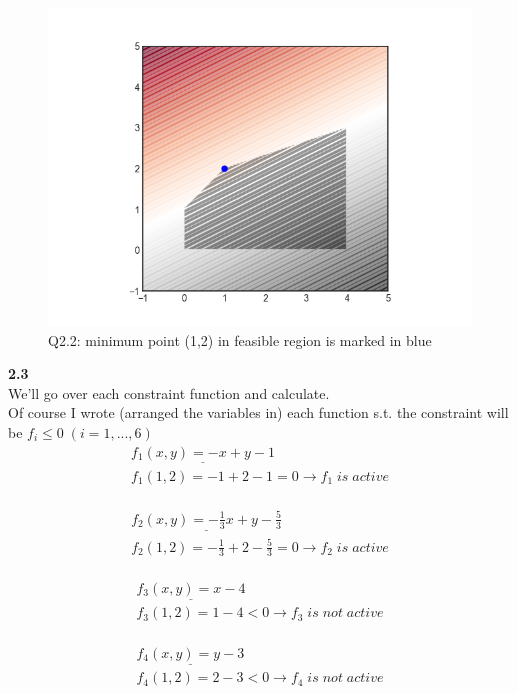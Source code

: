 \documentclass[fleqn]{article}
\begin{document}
\begin{figure}[h!]
\includegraphics[width=0.8\linewidth]{q2_2.PNG}
\caption{Q2.2: minimum point (1,2) in feasible region is marked in blue}
\end{figure}

\textbf{2.3} \\
We'll go over each constraint function and calculate.\\
Of course I wrote (arranged the variables in) each function s.t. the constraint will be $f_i \leq 0 \; (i=1,...,6)$\\

\begin{multline*}
\underline{f_1(x,y) = -x+y-1} \\
f_1(1,2) = -1+2-1 = 0 \rightarrow \boxed{f_1 \; is \; active}
\end{multline*} \\

\begin{multline*}
\underline{f_2(x,y) = -\frac{1}{3}x+y-\frac{5}{3}} \\
f_2(1,2) = -\frac{1}{3}+2-\frac{5}{3} = 0 \rightarrow \boxed{f_2 \; is \; active}
\end{multline*} \\

\begin{multline*}
\underline{f_3(x,y) = x-4} \\
f_3(1,2) = 1-4<0 \rightarrow \boxed{f_3 \; is \; not \; active}
\end{multline*} \\

\begin{multline*}
\underline{f_4(x,y) = y-3} \\
f_4(1,2) = 2-3<0 \rightarrow \boxed{f_4 \; is \; not \; active}
\end{multline*} \\
\end{document}
